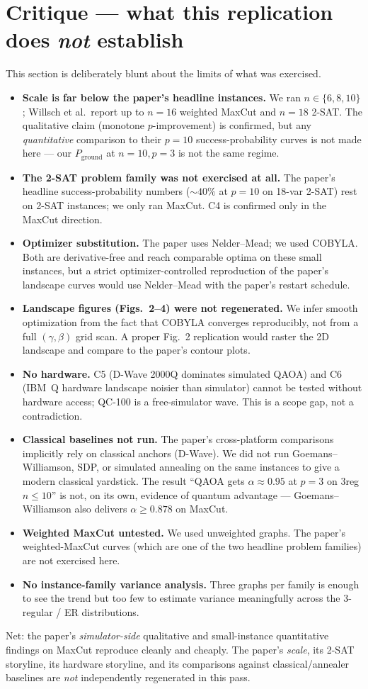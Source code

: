 \documentclass[11pt]{article}
\begin{document}
\section{Critique --- what this replication does \emph{not} establish}
This section is deliberately blunt about the limits of what was exercised.
\begin{itemize}
  \item \textbf{Scale is far below the paper's headline instances.} We ran $n\in\{6,8,10\}$; Willsch et al.\ report up to $n=16$ weighted MaxCut and $n=18$ 2-SAT. The qualitative claim (monotone $p$-improvement) is confirmed, but any \emph{quantitative} comparison to their $p=10$ success-probability curves is not made here --- our $P_{\text{ground}}$ at $n=10, p=3$ is not the same regime.
  \item \textbf{The 2-SAT problem family was not exercised at all.} The paper's headline success-probability numbers ($\sim 40\%$ at $p=10$ on 18-var 2-SAT) rest on 2-SAT instances; we only ran MaxCut. C4 is confirmed only in the MaxCut direction.
  \item \textbf{Optimizer substitution.} The paper uses Nelder--Mead; we used COBYLA. Both are derivative-free and reach comparable optima on these small instances, but a strict optimizer-controlled reproduction of the paper's landscape curves would use Nelder--Mead with the paper's restart schedule.
  \item \textbf{Landscape figures (Figs.~2--4) were not regenerated.} We infer smooth optimization from the fact that COBYLA converges reproducibly, not from a full $(\gamma,\beta)$ grid scan. A proper Fig.~2 replication would raster the 2D landscape and compare to the paper's contour plots.
  \item \textbf{No hardware.} C5 (D-Wave 2000Q dominates simulated QAOA) and C6 (IBM~Q hardware landscape noisier than simulator) cannot be tested without hardware access; QC-100 is a free-simulator wave. This is a scope gap, not a contradiction.
  \item \textbf{Classical baselines not run.} The paper's cross-platform comparisons implicitly rely on classical anchors (D-Wave). We did not run Goemans--Williamson, SDP, or simulated annealing on the same instances to give a modern classical yardstick. The result ``QAOA gets $\alpha\approx 0.95$ at $p=3$ on 3reg $n\le 10$'' is not, on its own, evidence of quantum advantage --- Goemans--Williamson also delivers $\alpha\ge 0.878$ on MaxCut.
  \item \textbf{Weighted MaxCut untested.} We used unweighted graphs. The paper's weighted-MaxCut curves (which are one of the two headline problem families) are not exercised here.
  \item \textbf{No instance-family variance analysis.} Three graphs per family is enough to see the trend but too few to estimate variance meaningfully across the 3-regular / ER distributions.
\end{itemize}
Net: the paper's \emph{simulator-side} qualitative and small-instance quantitative findings on MaxCut reproduce cleanly and cheaply. The paper's \emph{scale}, its 2-SAT storyline, its hardware storyline, and its comparisons against classical/annealer baselines are \emph{not} independently regenerated in this pass.
\end{document}
